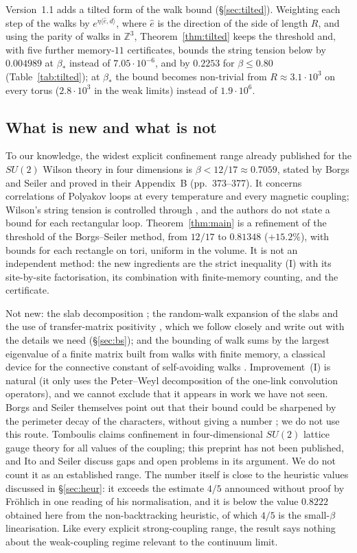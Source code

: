 \documentclass[11pt,a4paper]{article}
\theoremstyle{plain}
\theoremstyle{remark}
\numberwithin{equation}{section}
\newcommand{\Z}{\mathbb{Z}}
\begin{document}
Version~1.1 adds a tilted form of the walk bound (\S\ref{sec:tilted}). Weighting each step of the walks by
$e^{\eta\langle\hat e,d\rangle}$, where $\hat e$ is the direction of the side of length $R$, and using the parity of walks in $\Z^3$,
Theorem~\ref{thm:tilted} keeps the threshold and, with five further memory-$11$ certificates, bounds the string tension below by
$0.004989$ at $\beta_*$ instead of $7.05\cdot10^{-6}$, and by $0.2253$ for $\beta\le0.80$ (Table~\ref{tab:tilted}); at $\beta_*$ the bound
becomes non-trivial from $R\approx3.1\cdot10^{3}$ on every torus ($2.8\cdot10^{3}$ in the weak limits) instead of $1.9\cdot10^{6}$.

\subsection{What is new and what is not}
To our knowledge, the widest explicit confinement range already published for the $SU(2)$ Wilson theory in four dimensions
is $\beta<12/17\approx0.7059$, stated by Borgs and Seiler \cite[(II.55), p.~343]{BS83} and proved in their Appendix~B (pp.~373--377).
It concerns correlations of Polyakov loops at every temperature and every magnetic coupling; Wilson's string tension is controlled through \cite[(II.50), p.~341]{BS83}, and the
authors do not state a bound for each rectangular loop. Theorem~\ref{thm:main} is a refinement of the threshold of the Borgs--Seiler
method, from $12/17$ to $0.81348$ ($+15.2\%$), with bounds for each rectangle on tori, uniform in the volume. It is not an independent
method: the new ingredients are the strict inequality (I) with its site-by-site factorisation, its combination with finite-memory
counting, and the certificate.

Not new: the slab decomposition \cite{DF80}; the random-walk expansion of the slabs and the use of transfer-matrix positivity
\cite{BS83}, which we follow closely and write out with the details we need (\S\ref{sec:bs}); and the bounding of walk sums by the
largest eigenvalue of a finite matrix built from walks with finite memory, a classical device for the connective constant of
self-avoiding walks \cite{Alm93,PT00}. Improvement~(I) is natural (it only uses the Peter--Weyl decomposition of the one-link
convolution operators), and we cannot exclude that it appears in work we have not seen. Borgs and Seiler themselves point out that
their bound could be sharpened by the perimeter decay of the characters, without giving a number \cite[p.~377]{BS83}; we do not use
this route. Tomboulis \cite{Tom07} claims confinement in four-dimensional $SU(2)$ lattice gauge theory for all values of the
coupling; this preprint has not been published, and Ito and Seiler \cite{IS08} discuss gaps and open problems in its argument. We do
not count it as an established range. The number itself is close to the
heuristic values discussed in \S\ref{sec:heur}: it exceeds the estimate $4/5$ announced without proof by Fr\"ohlich
\cite{Fro80a,Fro80b} in one reading of his normalisation, and it is below the value $0.8222$ obtained here from the non-backtracking
heuristic, of which $4/5$ is the small-$\beta$ linearisation. Like every explicit strong-coupling range, the result says nothing about the weak-coupling regime
relevant to the continuum limit.
\end{document}
